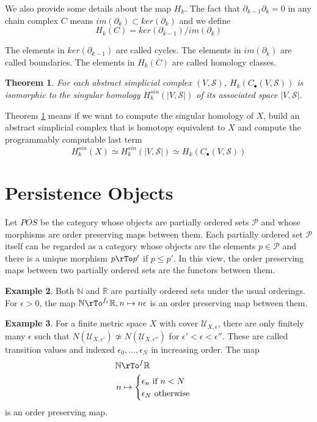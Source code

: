 \documentclass[12pt]{amsart}
\newtheorem{theorem}{Theorem}[section]
\theoremstyle{definition}
\newtheorem{example}[theorem]{Example}
\begin{document}
We also provide some details about the map $H_k$. The fact that $\partial_{k-1}\partial_k = 0$ in any chain complex $C$ means $im(\partial_k) \subset ker(\partial_k)$ and we define
$$H_k(C) = ker(\partial_{k-1})/im(\partial_k)$$

The elements in $ker(\partial_{k-1})$ are called cycles. The elements in $im(\partial_k)$ are called boundaries. The elements in $H_k(C)$ are called homology classes.

\begin{theorem}\label{homologyabstractsimplicialcomplex} For each abstract simplicial complex $(V, \mathcal{S})$, $H_k(C_{\bullet}(V, \mathcal{S}))$ is isomorphic to the singular homology $H_k^{sin}(|V, \mathcal{S}|)$ of its associated space $|V, \mathcal{S}|$.
\end{theorem}

Theorem \ref{homologyabstractsimplicialcomplex} means if we want to compute the singular homology of $X$, build an abstract simplicial complex that is homotopy equivalent to $X$ and compute the programmably computable last term
$$H^{sin}_k(X) \simeq H^{sin}_k(|V, \mathcal{S}|) \simeq H_k(C_{\bullet}(V, \mathcal{S}))$$

\section{Persistence Objects} Let $POS$ be the category whose objects are partially ordered sets $\mathcal{P}$ and whose morphisms are order preserving maps between them. Each partially ordered set $\mathcal{P}$ itself can be regarded as a category whose objects are the elements $p \in \mathcal{P}$ and there is a unique morphism $p \rTo p'$ if $p \leq p'$. In this view, the order preserving maps between two partially ordered sets are the functors between them.

\begin{example}\label{orderpreservingmap1} Both $\mathbb{N}$ and $\mathbb{R}$ are partially ordered sets under the usual orderings. For $\epsilon > 0$, the map $\mathbb{N} \rTo^{f_{\epsilon}} \mathbb{R}, n \mapsto n \epsilon$ is an order preserving map between them.
\end{example}
\begin{example}\label{orderpreservingmap2} For a finite metric space $X$ with cover $\mathcal{U}_{X, \epsilon}$, there are only finitely many $\epsilon$ such that $N(\mathcal{U}_{X, \epsilon'}) \not\simeq N(\mathcal{U}_{X, \epsilon''})$ for $\epsilon' < \epsilon < \epsilon''$. These are called transition values and indexed $\epsilon_0, \dots , \epsilon_N$ in increasing order. The map
\begin{align*}
\mathbb{N} & \rTo^f \mathbb{R} \\
n & \mapsto \begin{cases} \epsilon_n \text{ if } n < N \\ \epsilon_N \text{ otherwise }\end{cases}
\end{align*} 
is an order preserving map.
\end{example}
\end{document}
